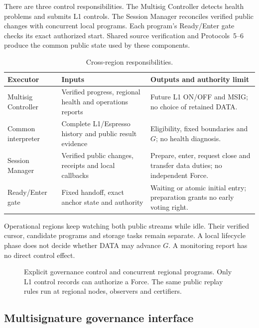 \documentclass[11pt,a4paper]{article}
\begin{document}
There are three control responsibilities. The Multisig Controller
detects health problems and submits L1 controls. The Session Manager
reconciles verified public changes with concurrent local programs.
Each program's Ready/Enter gate checks its exact authorized start.
Shared source verification and Protocols~5--6 produce the common
public state used by these components.

\begin{table}[htbp]\centering\small
\caption{Cross-region responsibilities.}
\label{tab:runtime-modules}
\begin{tabularx}{\linewidth}{@{}p{.22\linewidth}Y Y@{}}\toprule
Executor & Inputs & Outputs and authority limit\\\midrule
Multisig Controller & Verified progress, regional health and operations
reports & Future L1 ON/OFF and MSIG; no choice of retained DATA.\\
Common interpreter & Complete L1/Espresso history and public result
evidence & Eligibility, fixed boundaries and $G$; no health diagnosis.\\
Session Manager & Verified public changes, receipts and local callbacks
& Prepare, enter, request close and transfer data duties; no independent Force.\\
Ready/Enter gate & Fixed handoff, exact anchor state and authority
& Waiting or atomic initial entry; preparation grants no early voting right.\\\bottomrule
\end{tabularx}
\end{table}

Operational regions keep watching both public streams while idle.
Their verified cursor, candidate programs and storage tasks remain
separate. A local lifecycle phase does not decide whether DATA may
advance $G$. A monitoring report has no direct control effect.

\begin{figure}[p]\centering

\caption{Explicit governance control and concurrent regional programs.
Only L1 control records can authorize a Force. The same public replay
rules run at regional nodes, observers and certifiers.}
\label{fig:runtime-modules}
\end{figure}
\FloatBarrier

\subsection{Multisignature governance interface}
\label{sec:runtime-controls}

\end{document}
